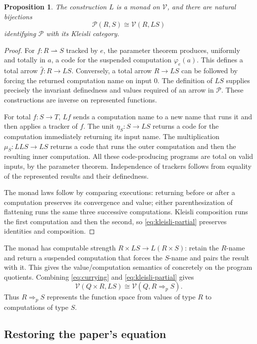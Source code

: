 \documentclass[11pt]{article}
\newtheorem{proposition}[theorem]{Proposition}
\theoremstyle{definition}
\newcommand{\Pcat}{\mathcal P}
\newcommand{\Vcat}{\mathcal V}
\newcommand{\pArr}{\mathbin{\Rightarrow_{\!p}}}
\begin{document}
\begin{proposition}\label{prop:lift}
The construction $L$ is a monad on $\Vcat$, and there are natural
bijections
\begin{equation}\label{eq:kleisli-partial}
 \Pcat(R,S)\cong\Vcat(R,LS)
\end{equation}
identifying $\Pcat$ with its Kleisli category.
\end{proposition}
\begin{proof}
For $f:R\rightharpoonup S$ tracked by $e$, the parameter theorem
produces, uniformly and totally in $a$, a code for the suspended
computation $\varphi_e(a)$. This defines a total arrow
$\widehat f:R\to LS$. Conversely, a total arrow $R\to LS$
can be followed by forcing the returned computation name on input
$0$. The definition of $LS$ supplies precisely the invariant
definedness and values required of an arrow in $\Pcat$. These
constructions are inverse on represented functions.

For total $f:S\to T$, $Lf$ sends a computation name to a new name
that runs it and then applies a tracker of $f$. The unit
$\eta_S:S\to LS$ returns a code for the computation immediately
returning its input name. The multiplication $\mu_S:LLS\to LS$
returns a code that runs the outer computation and then the resulting
inner computation. All these code-producing programs are total on
valid inputs, by the parameter theorem. Independence of trackers
follows from equality of the represented results and their definedness.

The monad laws follow by comparing executions: returning before or
after a computation preserves its convergence and value; either
parenthesization of flattening runs the same three successive
computations. Kleisli composition runs the first computation and then
the second, so \eqref{eq:kleisli-partial} preserves identities and
composition.
\end{proof}

The monad has computable strength
$R\times LS\to L(R\times S)$: retain the $R$-name and return
a suspended computation that forces the $S$-name and pairs the result
with it. This gives the value/computation semantics of
\cite{Moggi,BFS} concretely on the program quotients.
Combining \eqref{eq:currying} and \eqref{eq:kleisli-partial} gives
\[
 \Vcat(Q\times R,LS)\cong\Vcat(Q,R\pArr S).
\]
Thus $R\pArr S$ represents the function space from values of type
$R$ to computations of type $S$.

\subsection{Restoring the paper's equation}
\end{document}
